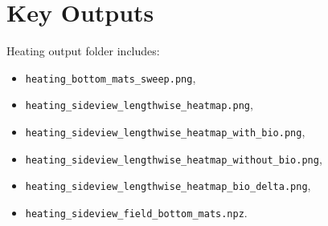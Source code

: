 \documentclass[11pt]{article}
\begin{document}
\section{Key Outputs}
Heating output folder includes:
\begin{itemize}
\item \texttt{heating\_bottom\_mats\_sweep.png},
\item \texttt{heating\_sideview\_lengthwise\_heatmap.png},
\item \texttt{heating\_sideview\_lengthwise\_heatmap\_with\_bio.png},
\item \texttt{heating\_sideview\_lengthwise\_heatmap\_without\_bio.png},
\item \texttt{heating\_sideview\_lengthwise\_heatmap\_bio\_delta.png},
\item \texttt{heating\_sideview\_field\_bottom\_mats.npz}.
\end{itemize}
\end{document}
